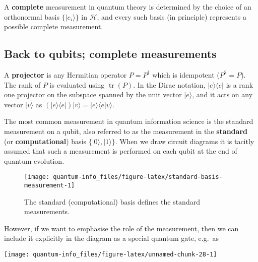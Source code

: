 \documentclass[fleqn]{article}
\newenvironment{idea}{\noindent}{\medskip}
\begin{document}
\begin{idea}

A \textbf{complete} measurement in quantum theory is determined by the choice of an orthonormal basis \(\{|e_i\rangle\}\) in \(\mathcal{H}\), and every such basis (in principle) represents a possible complete measurement.

\end{idea}

\hypertarget{back-to-qubits-complete-measurements}{%
\subsection{Back to qubits; complete measurements}\label{back-to-qubits-complete-measurements}}

\begin{idea}

A \textbf{projector} is any Hermitian operator \(P=P^\dagger\) which is idempotent (\(P^2=P\)).
The rank of \(P\) is evaluated using \(\operatorname{tr}(P)\).
In the Dirac notation, \(|e\rangle\langle e|\) is a rank one projector on the subspace spanned by the unit vector \(|e\rangle\), and it acts on any vector \(|v\rangle\) as \((|e\rangle\langle e|)|v\rangle = |e\rangle\langle e|v\rangle\).

\end{idea}

The most common measurement in quantum information science is the standard measurement on a qubit, also referred to as the measurement in the \textbf{standard} (or \textbf{computational}) basis \(\{|0\rangle,|1\rangle\}\).
When we draw circuit diagrams it is tacitly assumed that such a measurement is performed on each qubit at the end of quantum evolution.

\begin{figure}[H]

{\centering \texttt{[image: quantum-info\_files/figure-latex/standard-basis-measurement-1]} 

}

\caption{The standard (computational) basis defines the standard measurements.}\label{fig:standard-basis-measurement}
\end{figure}

However, if we want to emphasise the role of the measurement, then we can include it explicitly in the diagram as a special quantum gate, e.g.~as

\begin{center}\texttt{[image: quantum-info\_files/figure-latex/unnamed-chunk-28-1]} \end{center}
\end{document}
